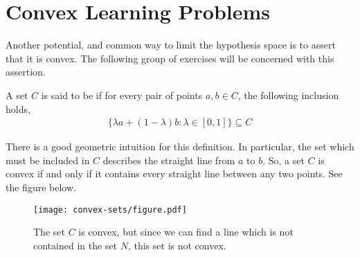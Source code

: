 \chapter{Convex Learning Problems}

Another potential, and common way to limit the hypothesis space is to assert that it is convex. The following group of exercises will be concerned with this assertion.

\begin{definition}
	A set $ C $ is said to be  if for every pair of points $ a,b \in C $, the following inclusion holds,
	\begin{align*}
		\{ \lambda a + (1- \lambda) b: \lambda \in [ 0,1 ] \} \subseteq C
	\end{align*}
\end{definition}

There is a good geometric intuition for this definition. In particular, the set which must be included in $ C $ describes the straight line from $ a $ to $ b $. So, a set $ C $ is convex if and only if it contains every straight line between any two points. See the figure below.

\begin{figure}[!htb]
	\centering
	\texttt{[image: convex-sets/figure.pdf]}
	\caption{The set $ C $ is convex, but since we can find a line which is not contained in the set $ N $, this set is not convex.}
\end{figure}

